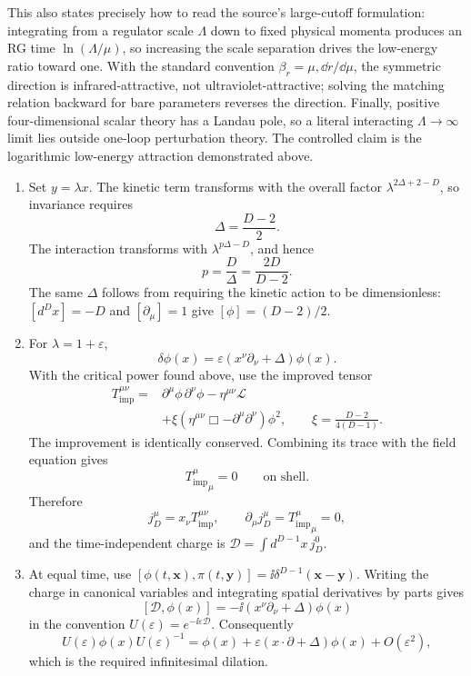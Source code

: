\begin{enumerate}
\begin{enumerate}
This also states precisely how to read the source's large-cutoff
formulation: integrating from a regulator scale \(\Lambda\) down to fixed
physical momenta produces an RG time \(\ln(\Lambda/\mu)\), so increasing
the scale separation drives the low-energy ratio toward one.  With the
standard convention \(\beta_r=\mu,\dd r/\dd\mu\), the symmetric direction is
infrared-attractive, not ultraviolet-attractive; solving the matching
relation backward for bare parameters reverses the direction.  Finally,
positive four-dimensional scalar theory has a Landau pole, so a literal
interacting \(\Lambda\to\infty\) limit lies outside one-loop perturbation
theory.  The controlled claim is the logarithmic low-energy attraction
demonstrated above.
\end{enumerate}

\begin{enumerate}
\item
Set \(y=\lambda x\).  The kinetic term transforms with the overall factor
\(\lambda^{2\Delta+2-D}\), so invariance requires
\[
 \Delta=\frac{D-2}{2}.
\]
The interaction transforms with \(\lambda^{p\Delta-D}\), and hence
\[
 p=\frac{D}{\Delta}=\frac{2D}{D-2}.
\]
The same \(\Delta\) follows from requiring the kinetic action to be
dimensionless: \([d^Dx]=-D\) and
\([\partial_\mu]=1\) give \([\phi]=(D-2)/2\).
\item
For \(\lambda=1+\varepsilon\),
\[
 \delta\phi(x)=\varepsilon
 \left(x^\nu\partial_\nu+\Delta\right)\phi(x).
\]
With the critical power found above, use the improved tensor
\[
\begin{aligned}
 T_{\mathrm{imp}}^{\mu\nu}
 ={}&\partial^\mu\phi\,\partial^\nu\phi
 -\eta^{\mu\nu}\mathcal L\\
 &+\xi\left(\eta^{\mu\nu}\Box-\partial^\mu\partial^\nu\right)\phi^2,
 \qquad
 \xi=\frac{D-2}{4(D-1)}.
\end{aligned}
\]
The improvement is identically conserved.  Combining its trace with the
field equation gives
\[
 {T_{\mathrm{imp}}^\mu}_\mu=0
 \qquad\text{on shell}.
\]
Therefore
\[
 j_D^\mu=x_\nu T_{\mathrm{imp}}^{\mu\nu},
 \qquad
 \partial_\mu j_D^\mu
 ={T_{\mathrm{imp}}^\mu}_\mu=0,
\]
and the time-independent charge is
\(\mathcal D=\int d^{D-1}x\,j_D^0\).
\item
At equal time, use
\([\phi(t,\mathbf x),\pi(t,\mathbf y)]
=\ii\delta^{D-1}(\mathbf x-\mathbf y)\).
Writing the charge in canonical variables and integrating spatial
derivatives by parts gives
\[
 [\mathcal D,\phi(x)]
 =-\ii\left(x^\nu\partial_\nu+\Delta\right)\phi(x)
\]
in the convention
\(U(\varepsilon)=e^{-\ii\varepsilon\mathcal D}\).
Consequently
\[
 U(\varepsilon)\phi(x)U(\varepsilon)^{-1}
 =\phi(x)+\varepsilon
 (x\cdot\partial+\Delta)\phi(x)+O(\varepsilon^2),
\]
which is the required infinitesimal dilation.


\end{enumerate}
\end{enumerate}
